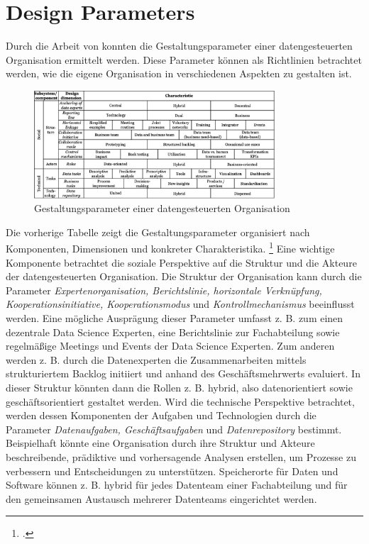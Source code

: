\section{Design Parameters}

Durch die Arbeit von  konnten die Gestaltungsparameter einer datengesteuerten Organisation ermittelt werden.
Diese Parameter können als Richtlinien betrachtet werden, wie die eigene Organisation in verschiedenen Aspekten zu gestalten ist.

\begin{figure}[htb]
    \centering
    \includegraphics[width=0.8\textwidth]{graphics/DDO_design.png}
    \caption{Gestaltungsparameter einer datengesteuerten Organisation}
    \label{fig:DDOs design}
\end{figure}

Die vorherige Tabelle zeigt die Gestaltungsparameter organisiert nach Komponenten, Dimensionen und konkreter Charakteristika. \footcite[Vgl.][S. 5]{JanineAdinaHagen.2020}
Eine wichtige Komponente betrachtet die soziale Perspektive auf die Struktur und die Akteure der datengesteuerten Organisation.
Die Struktur der Organisation kann durch die Parameter \textit{Expertenorganisation, Berichtslinie, horizontale Verknüpfung, Kooperationsinitiative, Kooperationsmodus} und \textit{Kontrollmechanismus} beeinflusst werden.
Eine mögliche Ausprägung dieser Parameter umfasst z. B. zum einen dezentrale Data Science Experten, eine Berichtslinie zur Fachabteilung sowie regelmäßige Meetings und Events der Data Science Experten.
Zum anderen werden z. B. durch die Datenexperten die Zusammenarbeiten mittels strukturiertem Backlog initiiert und anhand des Geschäftsmehrwerts evaluiert.
In dieser Struktur könnten dann die Rollen z. B. hybrid, also datenorientiert sowie geschäftsorientiert gestaltet werden.
Wird die technische Perspektive betrachtet, werden dessen Komponenten der Aufgaben und Technologien durch die Parameter \textit{Datenaufgaben, Geschäftsaufgaben} und \textit{Datenrepository} bestimmt.
Beispielhaft könnte eine Organisation durch ihre Struktur und Akteure beschreibende, prädiktive und vorhersagende Analysen erstellen, um Prozesse zu verbessern und Entscheidungen zu unterstützen.
Speicherorte für Daten und Software können z. B. hybrid für jedes Datenteam einer Fachabteilung und für den gemeinsamen Austausch mehrerer Datenteams eingerichtet werden.

